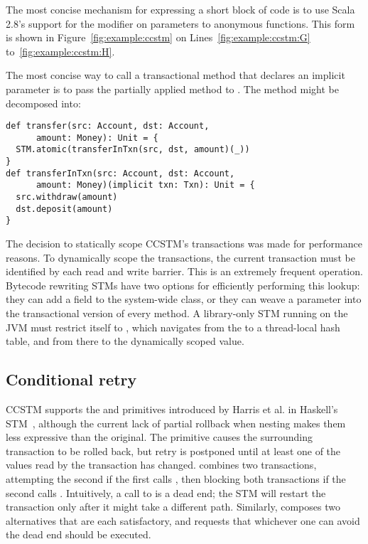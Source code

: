 The most concise mechanism for expressing a short block of code is to use
Scala 2.8's support for the  modifier on parameters to
anonymous functions.  This form is shown in Figure~\ref{fig:example:ccstm}
on Lines~\ref{fig:example:ccstm:G} to~\ref{fig:example:ccstm:H}.

The most concise way to call a transactional method that declares an implicit
 parameter is to pass the partially applied method to
.  The  method
might be decomposed into:
\lstset{numbers=none}
\begin{lstlisting}
def transfer(src: Account, dst: Account,
      amount: Money): Unit = {
  STM.atomic(transferInTxn(src, dst, amount)(_))
}
def transferInTxn(src: Account, dst: Account,
      amount: Money)(implicit txn: Txn): Unit = {
  src.withdraw(amount)
  dst.deposit(amount)
}
\end{lstlisting}
\lstset{numbers=left}


The decision to statically scope CCSTM's transactions was made for
performance reasons.  To dynamically scope the transactions, the
current transaction must be identified by each read and write barrier.
This is an extremely frequent operation.  Bytecode rewriting STMs have
two options for efficiently performing this lookup: they can add a field
to the system-wide  class, or they can weave a 
parameter into the transactional version of every method.  A library-only
STM running on the JVM must restrict itself to ,
which navigates from the  to a thread-local hash table,
and from there to the dynamically scoped value.

\subsection{Conditional retry}

CCSTM supports the  and  primitives introduced by
Harris et al. in Haskell's STM~\cite{harris05ctm}, although the current
lack of partial rollback when nesting makes them less expressive than the original.
The  primitive causes the surrounding transaction to be rolled
back, but retry is postponed until at least one of the values read by
the transaction has changed.   combines two transactions,
attempting the second if the first calls , then blocking
both transactions if the second calls .  Intuitively, a call
to  is a dead end; the STM will restart the transaction
only after it might take a different path.  Similarly, 
composes two alternatives that are each satisfactory, and requests that
whichever one can avoid the dead end should be executed.

